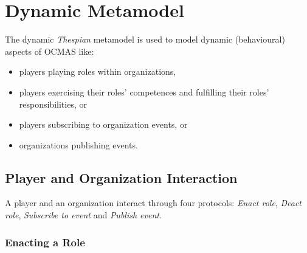 
\section{Dynamic Metamodel}

The dynamic \textit{Thespian} metamodel is used to model dynamic (behavioural) aspects of OCMAS like:
\begin{itemize}
	\item players playing roles within organizations,
	\item players exercising their roles' competences and fulfilling their roles' responsibilities, or
	\item players subscribing to organization events, or
	\item organizations publishing events.
\end{itemize}

\subsection{Player and Organization Interaction}

A player and an organization interact through four protocols: \textit{Enact role}, \textit{Deact role}, \textit{Subscribe to event} and \textit{Publish event}.

\subsubsection{Enacting a Role}


